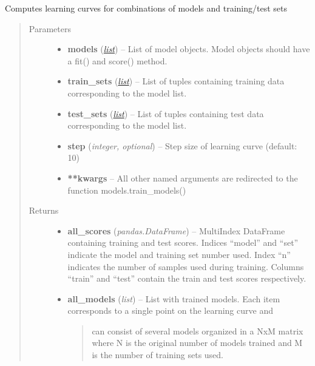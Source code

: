 \documentclass[letterpaper,10pt,english]{sphinxmanual}
\begin{document}
\begin{fulllineitems}
\label{flamingo/classification/index:flamingo.classification.test.compute_learning_curve}
Computes learning curves for combinations of models and training/test sets
\begin{quote}\begin{description}
\item[{Parameters}] \leavevmode\begin{itemize}
\item {} 
\textbf{models} (\href{http://docs.python.org/library/functions.html\#list}{\emph{list}}) -- List of model objects. Model objects should have a fit() and score() method.

\item {} 
\textbf{train\_sets} (\href{http://docs.python.org/library/functions.html\#list}{\emph{list}}) -- List of tuples containing training data corresponding to the model list.

\item {} 
\textbf{test\_sets} (\href{http://docs.python.org/library/functions.html\#list}{\emph{list}}) -- List of tuples containing test data corresponding to the model list.

\item {} 
\textbf{step} (\emph{integer, optional}) -- Step size of learning curve (default: 10)

\item {} 
\textbf{**kwargs} -- 
All other named arguments are redirected to the function models.train\_models()


\end{itemize}

\item[{Returns}] \leavevmode
\begin{itemize}
\item {} 
\textbf{all\_scores} (\emph{pandas.DataFrame}) --
MultiIndex DataFrame containing training and test scores.
Indices ``model'' and ``set'' indicate the model and training set number used.
Index ``n'' indicates the number of samples used during training.
Columns ``train'' and ``test'' contain the train and test scores respectively.

\item {} 
\textbf{all\_models} (\emph{list}) --
List with trained models.
Each item corresponds to a single point on the learning curve and
\begin{quote}

can consist of several models organized in a NxM matrix where
N is the original number of models trained and M is the number
of training sets used.
\end{quote}

\end{itemize}


\end{description}\end{quote}

\end{fulllineitems}
\end{document}
